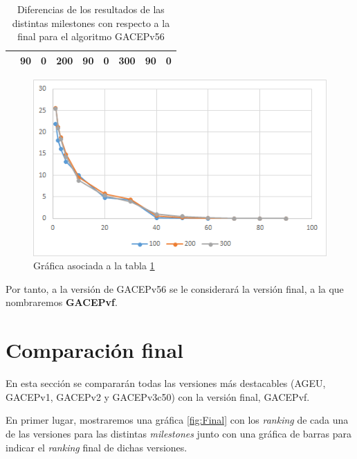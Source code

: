 \begin{table}[h]
\begin{tabular}{|cclcclccl|}
\rowcolor[HTML]{DAE8FC} 
\multicolumn{1}{|c|}{\multirow{-13}{*}{\cellcolor[HTML]{FFFFC7}\textbf{100}}} & \multicolumn{1}{c|}{\cellcolor[HTML]{DAE8FC}90}        & \multicolumn{1}{l|}{\cellcolor[HTML]{DAE8FC}0}          & \multicolumn{1}{c|}{\multirow{-13}{*}{\cellcolor[HTML]{FFFFC7}\textbf{200}}} & \multicolumn{1}{c|}{\cellcolor[HTML]{DAE8FC}90}        & \multicolumn{1}{l|}{\cellcolor[HTML]{DAE8FC}0}          & \multicolumn{1}{c|}{\multirow{-13}{*}{\cellcolor[HTML]{FFFFC7}\textbf{300}}} & \multicolumn{1}{c|}{\cellcolor[HTML]{DAE8FC}90}        & 0          \\ \hline
\end{tabular}
\caption{\label{DiferenciasGACEPv56}Diferencias de los resultados de las distintas milestones con respecto a la final para el algoritmo GACEPv56}
\end{table}

\begin{figure}[h]
		\centering
		\includegraphics[scale=1]{imagenes/Experimental/DiferenciasGACEPv56.png}
        \caption{Gráfica asociada a la tabla \ref{DiferenciasGACEPv56}}
        \label{fig:DiferenciasGACEPv56}
\end{figure}


Por tanto, a la versión de GACEPv56 se le considerará la versión final, a la que nombraremos \textbf{GACEPvf}.

\section{Comparación final}

En esta sección se compararán todas las versiones más destacables (AGEU, GACEPv1, GACEPv2 y GACEPv3c50) con la versión final, GACEPvf. 

En primer lugar, mostraremos una gráfica \ref{fig:Final} con los \textit{ranking} de cada una de las versiones para las distintas \textit{milestones} junto con una gráfica de barras para indicar el \textit{ranking} final de dichas versiones. 

